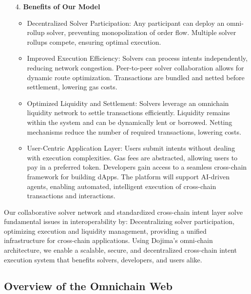 \begin{itemize}
    \item[4.] \textbf{Benefits of Our Model}

    \begin{itemize}
        \item Decentralized Solver Participation: Any participant can deploy an omni-rollup solver, preventing monopolization of order flow. Multiple solver rollups compete, ensuring optimal execution.

        \item Improved Execution Efficiency: Solvers can process intents independently, reducing network congestion. Peer-to-peer solver collaboration allows for dynamic route optimization. Transactions are bundled and netted before settlement, lowering gas costs.

        \item Optimized Liquidity and Settlement: Solvers leverage an omnichain liquidity network to settle transactions efficiently. Liquidity remains within the system and can be dynamically lent or borrowed. Netting mechanisms reduce the number of required transactions, lowering costs.

        \item User-Centric Application Layer: Users submit intents without dealing with execution complexities. Gas fees are abstracted, allowing users to pay in a preferred token. Developers gain access to a seamless cross-chain framework for building dApps. The platform will support AI-driven agents, enabling automated, intelligent execution of cross-chain transactions and interactions.
    \end{itemize}
\end{itemize}


Our collaborative solver network and standardized cross-chain intent layer solve fundamental issues in interoperability by:
Decentralizing solver participation, optimizing execution and liquidity management, providing a unified infrastructure for cross-chain applications. Using Dojima's omni-chain architecture, we enable a scalable, secure, and decentralized cross-chain intent execution system that benefits solvers, developers, and users alike.


\subsection{Overview of the Omnichain Web} %

